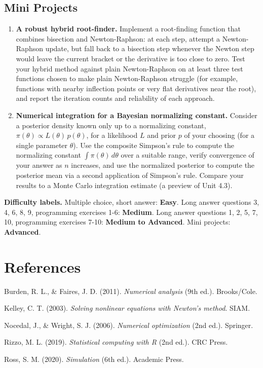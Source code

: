 \documentclass[
]{article}
\begin{document}
\subsection{Mini Projects}\label{mini-projects}

\begin{enumerate}
\def\labelenumi{\arabic{enumi}.}
\item
  \textbf{A robust hybrid root-finder.} Implement a root-finding
  function that combines bisection and Newton-Raphson: at each step,
  attempt a Newton-Raphson update, but fall back to a bisection step
  whenever the Newton step would leave the current bracket or the
  derivative is too close to zero. Test your hybrid method against plain
  Newton-Raphson on at least three test functions chosen to make plain
  Newton-Raphson struggle (for example, functions with nearby inflection
  points or very flat derivatives near the root), and report the
  iteration counts and reliability of each approach.
\item
  \textbf{Numerical integration for a Bayesian normalizing constant.}
  Consider a posterior density known only up to a normalizing constant,
  \(\pi(\theta) \propto L(\theta)\,p(\theta)\), for a likelihood \(L\)
  and prior \(p\) of your choosing (for a single parameter \(\theta\)).
  Use the composite Simpson's rule to compute the normalizing constant
  \(\int \pi(\theta)\,d\theta\) over a suitable range, verify
  convergence of your answer as \(n\) increases, and use the normalized
  posterior to compute the posterior mean via a second application of
  Simpson's rule. Compare your results to a Monte Carlo integration
  estimate (a preview of Unit 4.3).
\end{enumerate}

\textbf{Difficulty labels.} Multiple choice, short answer:
\textbf{Easy}. Long answer questions 3, 4, 6, 8, 9, programming
exercises 1-6: \textbf{Medium}. Long answer questions 1, 2, 5, 7, 10,
programming exercises 7-10: \textbf{Medium to Advanced}. Mini projects:
\textbf{Advanced}.

\section{References}\label{references}

Burden, R. L., \& Faires, J. D. (2011). \emph{Numerical analysis} (9th
ed.). Brooks/Cole.

Kelley, C. T. (2003). \emph{Solving nonlinear equations with Newton's
method}. SIAM.

Nocedal, J., \& Wright, S. J. (2006). \emph{Numerical optimization} (2nd
ed.). Springer.

Rizzo, M. L. (2019). \emph{Statistical computing with R} (2nd ed.). CRC
Press.

Ross, S. M. (2020). \emph{Simulation} (6th ed.). Academic Press.
\end{document}
